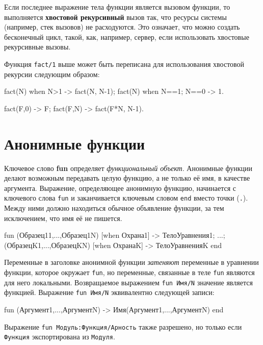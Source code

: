 Если последнее выражение тела функции является вызовом функции, то выполняется
\textbf{хвостовой рекурсивный} вызов так, что ресурсы системы (например, стек
вызовов) не расходуются. Это означает, что можно создать бесконечный цикл, такой,
как, например, сервер, если использовать хвостовые рекурсивные вызовы.

Функция \texttt{fact/1} выше может быть переписана для использования хвостовой
рекурсии следующим образом:

 \begin{erlang}
fact(N) when N>1 -> fact(N, N-1);
fact(N) when N==1; N==0 -> 1.

fact(F,0) -> F;       %
fact(F,N) -> fact(F*N, N-1).
\end{erlang}



\section{Анонимные функции}
\label{functions:funs}

Ключевое слово \textbf{fun} определяет \emph{функциональный объект}. Анонимные 
функции делают возможным передавать целую функцию, а не только её имя, в качестве
аргумента. Выражение, определяющее анонимную функцию, начинается с ключевого слова
\texttt{fun} и заканчивается ключевым словом \texttt{end} вместо точки 
(\texttt{.}).  Между ними должно находиться обычное объявление функции, за тем 
исключением, что имя её не пишется.

\begin{erlangru}
fun
    (Образец11,...,Образец1N) [when Охрана1] ->
        ТелоУравнения1;
        ...;
    (ОбразецK1,...,ОбразецKN) [when ОхранаK] ->
        ТелоУравненияK
end
\end{erlangru}

Переменные в заголовке анонимной функции \emph{затеняют} переменные в уравнении
функции, которое окружает \texttt{fun}, но переменные, связанные в теле 
\texttt{fun} являются для него локальными.  Возвращаемое выражением \texttt{fun 
Имя/N} значение является функцией. Выражение \texttt{fun Имя/N} эквивалентно 
следующей записи:

\begin{erlangru}
fun (Аргумент1,...,АргументN) -> Имя(Аргумент1,...,АргументN) end
\end{erlangru}

Выражение \texttt{fun Модуль:Функция/Арность} также разрешено, но только если 
\texttt{Функция} экспортирована из \texttt{Модуля}.

